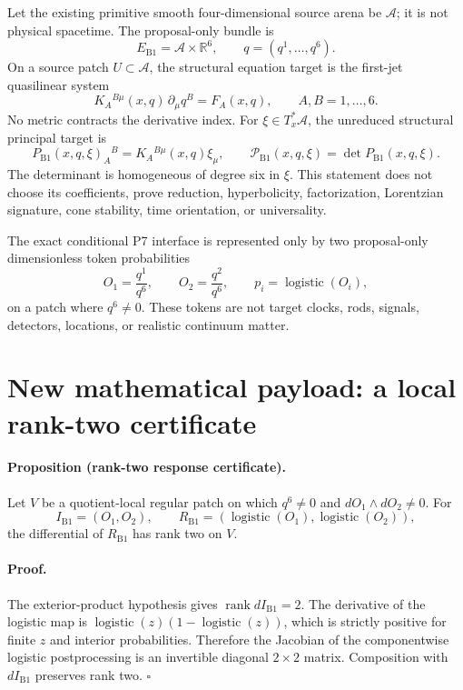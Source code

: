 \documentclass[11pt]{article}
\newcommand{\A}{\mathcal{A}}
\newcommand{\PB}{\mathcal{P}_{\mathrm{B1}}}
\newcommand{\sigm}{\operatorname{logistic}}
\begin{document}
Let the existing primitive smooth four-dimensional source arena be $\A$; it is
not physical spacetime. The proposal-only bundle is
\[
 E_{\mathrm{B1}}=\A\times\mathbb{R}^{6},\qquad
 q=(q^1,\ldots,q^6).
\]
On a source patch $U\subset\A$, the structural equation target is the
first-jet quasilinear system
\[
 K_A{}^{B\mu}(x,q)\,\partial_\mu q^B=F_A(x,q),
 \qquad A,B=1,\ldots,6.
\]
No metric contracts the derivative index. For $\xi\in T_x^*\A$, the
unreduced structural principal target is
\[
 P_{\mathrm{B1}}(x,q,\xi)_A{}^B
   =K_A{}^{B\mu}(x,q)\xi_\mu,
 \qquad
 \PB(x,q,\xi)=\det P_{\mathrm{B1}}(x,q,\xi).
\]
The determinant is homogeneous of degree six in $\xi$. This statement does
not choose its coefficients, prove reduction, hyperbolicity, factorization,
Lorentzian signature, cone stability, time orientation, or universality.

The exact conditional P7 interface is represented only by two proposal-only
dimensionless token probabilities
\[
 O_1=\frac{q^1}{q^6},\qquad O_2=\frac{q^2}{q^6},\qquad
 p_i=\sigm(O_i),
\]
on a patch where $q^6\neq0$. These tokens are not target clocks, rods,
signals, detectors, locations, or realistic continuum matter.

\section{New mathematical payload: a local rank-two certificate}

\paragraph{Proposition (rank-two response certificate).}
Let $V$ be a quotient-local regular patch on which $q^6\neq0$ and
$dO_1\wedge dO_2\neq0$. For
\[
 I_{\mathrm{B1}}=(O_1,O_2),\qquad
 R_{\mathrm{B1}}=(\sigm(O_1),\sigm(O_2)),
\]
the differential of $R_{\mathrm{B1}}$ has rank two on $V$.

\paragraph{Proof.}
The exterior-product hypothesis gives
$\operatorname{rank}dI_{\mathrm{B1}}=2$. The derivative of the logistic map
is $\sigm(z)(1-\sigm(z))$, which is strictly positive for finite $z$ and
interior probabilities. Therefore the Jacobian of the componentwise logistic
postprocessing is an invertible diagonal $2\times2$ matrix. Composition with
$dI_{\mathrm{B1}}$ preserves rank two. $\square$
\end{document}
